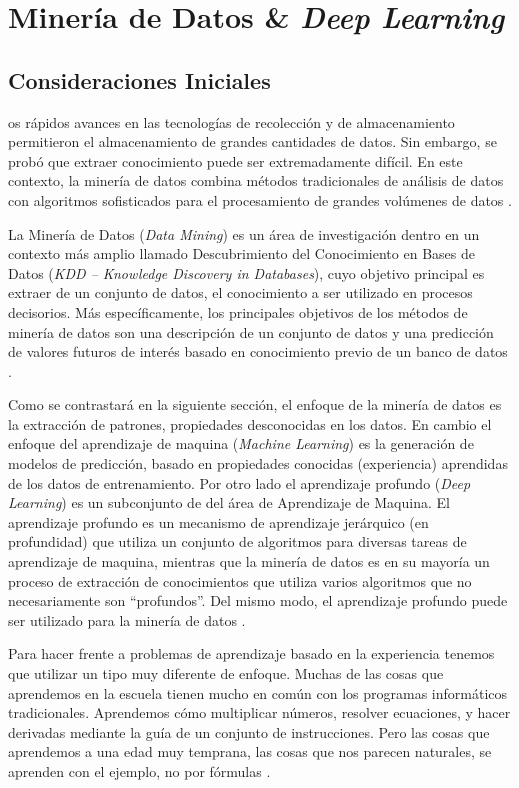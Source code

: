 \chapter{Minería de Datos \& \textit{Deep Learning}}\label{cap:deep_learning}

\section{Consideraciones Iniciales}

os rápidos avances en las tecnologías de recolección y de almacenamiento permitieron el almacenamiento de grandes cantidades de datos. Sin embargo, se probó que extraer conocimiento puede ser extremadamente difícil. En este contexto, la minería de datos combina métodos tradicionales de análisis de datos con algoritmos sofisticados para el procesamiento de grandes volúmenes de datos \cite{Tan:2005:IDM:1095618}.

La Minería de Datos (\textit{Data Mining}) es un área de investigación dentro en un contexto más amplio llamado Descubrimiento del Conocimiento en Bases de Datos (\textit{KDD – Knowledge Discovery in Databases}), cuyo objetivo principal es extraer de un conjunto de datos, el conocimiento a ser utilizado en procesos decisorios. Más específicamente, los principales objetivos de los métodos de minería de datos son una descripción de un conjunto de datos y una predicción de valores futuros de interés basado en conocimiento previo de un banco de datos \cite{Fayyad:1996:DMK:257938.257942}.


Como se contrastará   en la siguiente sección,  el enfoque de la minería de datos es  la extracción de patrones, propiedades desconocidas en los datos. En cambio el enfoque del aprendizaje de maquina (\textit{Machine Learning}) es la generación  de modelos de predicción, basado en propiedades conocidas (experiencia) aprendidas de los datos de entrenamiento.   Por otro lado el aprendizaje profundo (\textit{Deep Learning}) es un subconjunto de  del área de Aprendizaje de Maquina. El aprendizaje profundo es un mecanismo de aprendizaje jerárquico (en profundidad) que utiliza un conjunto de algoritmos para diversas tareas de aprendizaje de maquina, mientras que la minería de datos es en su mayoría un proceso de extracción de conocimientos que utiliza varios algoritmos que no necesariamente son ``profundos''. Del mismo modo, el aprendizaje profundo puede ser utilizado para la minería de datos \cite{dlBook}. 
 
Para hacer frente a  problemas de aprendizaje basado en la experiencia  tenemos  que utilizar un tipo muy diferente de enfoque. Muchas de las cosas que aprendemos en la escuela tienen mucho en común con los programas informáticos tradicionales. Aprendemos cómo multiplicar números, resolver ecuaciones, y hacer derivadas mediante la guía de un conjunto de instrucciones. Pero las cosas que aprendemos a una edad muy temprana, las cosas que nos parecen naturales, se aprenden con el ejemplo, no por fórmulas \cite{dlBook}.
 
